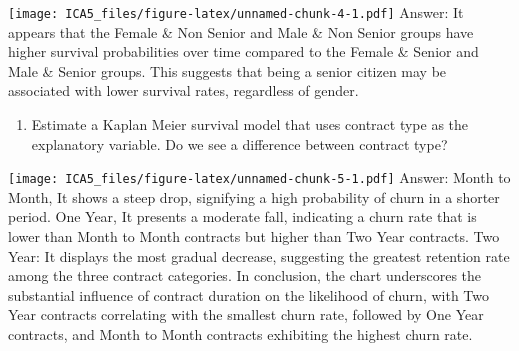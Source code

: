 \documentclass[
]{article}
\newenvironment{Shaded}{\begin{snugshade}}{\end{snugshade}}
\newcommand{\AttributeTok}[1]{\textcolor[rgb]{0.13,0.29,0.53}{#1}}
\newcommand{\ConstantTok}[1]{\textcolor[rgb]{0.56,0.35,0.01}{#1}}
\newcommand{\DecValTok}[1]{\textcolor[rgb]{0.00,0.00,0.81}{#1}}
\newcommand{\FunctionTok}[1]{\textcolor[rgb]{0.13,0.29,0.53}{\textbf{#1}}}
\newcommand{\NormalTok}[1]{#1}
\newcommand{\OtherTok}[1]{\textcolor[rgb]{0.56,0.35,0.01}{#1}}
\newcommand{\SpecialCharTok}[1]{\textcolor[rgb]{0.81,0.36,0.00}{\textbf{#1}}}
\newcommand{\StringTok}[1]{\textcolor[rgb]{0.31,0.60,0.02}{#1}}
\providecommand{\tightlist}{%
  \setlength{\itemsep}{0pt}\setlength{\parskip}{0pt}}
\begin{document}
\texttt{[image: ICA5\_files/figure-latex/unnamed-chunk-4-1.pdf]} Answer:
It appears that the Female \& Non Senior and Male \& Non Senior groups
have higher survival probabilities over time compared to the Female \&
Senior and Male \& Senior groups. This suggests that being a senior
citizen may be associated with lower survival rates, regardless of
gender.

\begin{enumerate}
\def\labelenumi{\arabic{enumi})}
\setcounter{enumi}{4}
\tightlist
\item
  Estimate a Kaplan Meier survival model that uses contract type as the
  explanatory variable. Do we see a difference between contract type?
\end{enumerate}

\begin{Shaded}
\end{Shaded}

\texttt{[image: ICA5\_files/figure-latex/unnamed-chunk-5-1.pdf]} Answer:
Month to Month, It shows a steep drop, signifying a high probability of
churn in a shorter period. One Year, It presents a moderate fall,
indicating a churn rate that is lower than Month to Month contracts but
higher than Two Year contracts. Two Year: It displays the most gradual
decrease, suggesting the greatest retention rate among the three
contract categories. In conclusion, the chart underscores the
substantial influence of contract duration on the likelihood of churn,
with Two Year contracts correlating with the smallest churn rate,
followed by One Year contracts, and Month to Month contracts exhibiting
the highest churn rate.
\end{document}
